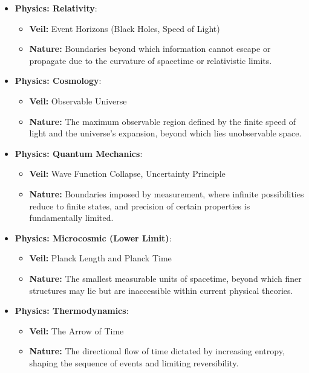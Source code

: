 \documentclass[12pt]{article}
\begin{document}
\begin{itemize}
    \item \textbf{Physics: Relativity}:
    \begin{itemize}
        \item \textbf{Veil:} Event Horizons (Black Holes, Speed of Light)
        \item \textbf{Nature:} Boundaries beyond which information cannot escape or propagate due to the curvature of spacetime or relativistic limits.
    \end{itemize}

    \item \textbf{Physics: Cosmology}:
    \begin{itemize}
        \item \textbf{Veil:} Observable Universe
        \item \textbf{Nature:} The maximum observable region defined by the finite speed of light and the universe's expansion, beyond which lies unobservable space.
    \end{itemize}

    \item \textbf{Physics: Quantum Mechanics}:
    \begin{itemize}
        \item \textbf{Veil:} Wave Function Collapse, Uncertainty Principle
        \item \textbf{Nature:} Boundaries imposed by measurement, where infinite possibilities reduce to finite states, and precision of certain properties is fundamentally limited.
    \end{itemize}

    \item \textbf{Physics: Microcosmic (Lower Limit)}:
    \begin{itemize}
        \item \textbf{Veil:} Planck Length and Planck Time
        \item \textbf{Nature:} The smallest measurable units of spacetime, beyond which finer structures may lie but are inaccessible within current physical theories.
    \end{itemize}
    
    \item \textbf{Physics: Thermodynamics}:
    \begin{itemize}
        \item \textbf{Veil:} The Arrow of Time
        \item \textbf{Nature:} The directional flow of time dictated by increasing entropy, shaping the sequence of events and limiting reversibility.
    \end{itemize}


\end{itemize}
\end{document}
